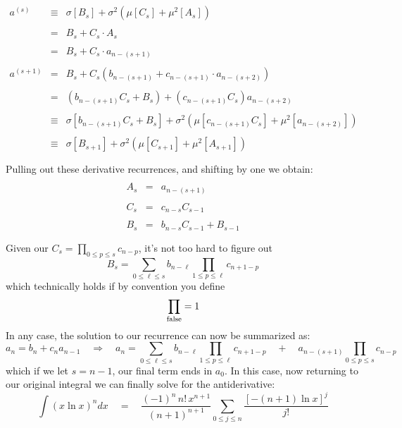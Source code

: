 \documentclass[twoside]{article}
\begin{document}
$$ \begin{array}{rcl}
														\\
a^{(s)}		& \equiv & \sigma[B_s]+\sigma^2(\mu[C_s]+\mu^2[A_s])	 					\\
														\\
		& =	 & B_s+C_s\cdot A_s				 					\\
														\\
		& =	 & B_s+C_s\cdot a_{n-(s+1)}			 					\\
														\\
a^{(s+1)}	& =	 & B_s+C_s(b_{n-(s+1)}+c_{n-(s+1)}\cdot a_{n-(s+2)})					\\
														\\
		& =	 & (b_{n-(s+1)}C_s+B_s)+(c_{n-(s+1)}C_s)a_{n-(s+2)}					\\
														\\
		& \equiv & \sigma[b_{n-(s+1)}C_s+B_s]+\sigma^2(\mu[c_{n-(s+1)}C_s]+\mu^2[a_{n-(s+2)}])		\\
														\\
		& \equiv & \sigma[B_{s+1}]+\sigma^2(\mu[C_{s+1}]+\mu^2[A_{s+1}])				\\
														\\
\end{array} $$
Pulling out these derivative recurrences, and shifting by one we obtain:
$$ \begin{array}{rcl}
					\\
A_s	& = & a_{n-(s+1)}		\\
					\\
C_s	& = & c_{n-s}C_{s-1}		\\
					\\
B_s	& = & b_{n-s}C_{s-1}+B_{s-1}	\\
					\\
\end{array} $$
Given our $ C_s=\prod_{0\le p\le s}c_{n-p} $, it's not too hard to figure out
$$ B_s=\sum_{0\le\ell\le s}b_{n-\ell}\prod_{1\le p\le\ell}\!\!\!\!c_{n+1-p} $$
which technically holds if by convention you define
$$ \prod_{\mbox{\scriptsize false}}=1 $$
In any case, the solution to our recurrence can now be summarized as:
$$ a_n = b_n + c_na_{n-1} \quad\Longrightarrow\quad
   a_n = \sum_{0\le\ell\le s}b_{n-\ell}\prod_{1\le p\le\ell}\!\!\!\!c_{n+1-p}\quad +\quad
	 a_{n-(s+1)}\prod_{0\le p\le s}c_{n-p} $$
which if we let $ s=n-1 $, our final term ends in $ a_0 $. In this case,
now returning to our original integral we can finally solve for the antiderivative:
$$ \int (x\ln x)^ndx\quad=\quad\frac{(-1)^n\,n!\,x^{n+1}}{(n+1)^{n+1}}\sum_{0\le j\le n}\frac{[-(n+1)\ln x]^j}{j!} $$
\end{document}
